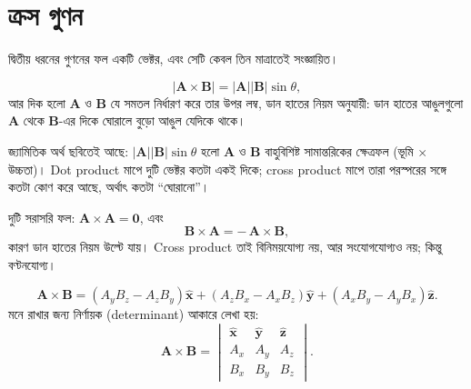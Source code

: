 \documentclass[11pt]{article}
\begin{document}
\section{ক্রস গুণন}

দ্বিতীয় ধরনের গুণনের ফল একটি ভেক্টর, এবং সেটি কেবল তিন মাত্রাতেই সংজ্ঞায়িত।

\begin{idea}
\[
  \left| \mathbf{A}\times\mathbf{B} \right|
  = |\mathbf{A}||\mathbf{B}|\sin\theta ,
\]
আর দিক হলো $\mathbf{A}$ ও $\mathbf{B}$ যে সমতল নির্ধারণ করে তার উপর লম্ব,
ডান হাতের নিয়ম অনুযায়ী: ডান হাতের আঙুলগুলো $\mathbf{A}$ থেকে $\mathbf{B}$-এর
দিকে ঘোরালে বুড়ো আঙুল যেদিকে থাকে।
\end{idea}

\begin{center}
\end{center}

জ্যামিতিক অর্থ ছবিতেই আছে: $|\mathbf{A}||\mathbf{B}|\sin\theta$ হলো
$\mathbf{A}$ ও $\mathbf{B}$ বাহুবিশিষ্ট সামান্তরিকের ক্ষেত্রফল (ভূমি $\times$
উচ্চতা)। Dot product মাপে দুটি ভেক্টর কতটা একই দিকে; cross product মাপে তারা পরস্পরের সঙ্গে কতটা কোণ করে আছে, অর্থাৎ কতটা ``ঘোরানো''।

দুটি সরাসরি ফল: $\mathbf{A}\times\mathbf{A} = \mathbf{0}$, এবং
\[
  \mathbf{B}\times\mathbf{A} = -\,\mathbf{A}\times\mathbf{B} ,
\]
কারণ ডান হাতের নিয়ম উল্টে যায়। Cross product তাই বিনিময়যোগ্য নয়, আর
সংযোগযোগ্যও নয়; কিন্তু বণ্টনযোগ্য।

\begin{idea}[উপাংশ ও নির্ণায়ক রূপ]
\[
  \mathbf{A}\times\mathbf{B}
  = \left( A_{y}B_{z}-A_{z}B_{y} \right)\hat{\mathbf{x}}
  + \left( A_{z}B_{x}-A_{x}B_{z} \right)\hat{\mathbf{y}}
  + \left( A_{x}B_{y}-A_{y}B_{x} \right)\hat{\mathbf{z}} .
\]
মনে রাখার জন্য নির্ণায়ক (determinant) আকারে লেখা হয়:
\[
  \mathbf{A}\times\mathbf{B} =
  \begin{vmatrix}
    \hat{\mathbf{x}} & \hat{\mathbf{y}} & \hat{\mathbf{z}} \\
    A_{x} & A_{y} & A_{z} \\
    B_{x} & B_{y} & B_{z}
  \end{vmatrix} .
\]
\end{idea}
\end{document}
